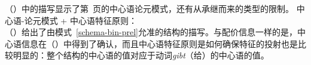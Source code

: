 （）中的描写显示了第~\pageref{schema-bin-prel}页的中心语论元模式，还有从承继而来的类型的限制。
\eas
\label{head-arg-schema-hfp}
中心语-论元模式 + 中心语特征原则：\\
\zs
（）给出了由模式~\ref{schema-bin-prel}允准的结构的描写。与配价信息一样的是，中心语信息在（）中得到了确认，而且中心语特征原则是如何确保特征的投射也是比较明显的：整个结构的中心语的值对应于动词\emph{gibt}（给）的中心语的值。
\ea
